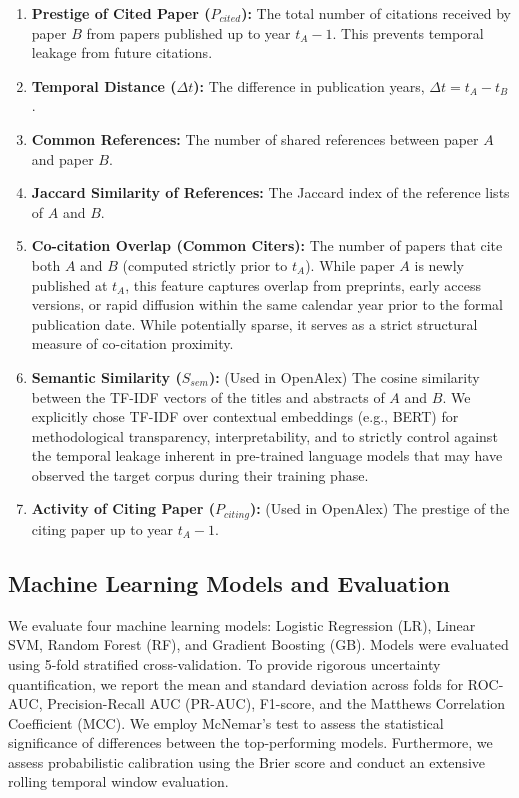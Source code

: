 \documentclass[12pt,a4paper]{article}
\begin{document}
\begin{enumerate}
    \item \textbf{Prestige of Cited Paper ($P_{cited}$):} The total number of citations received by paper $B$ from papers published up to year $t_A - 1$. This prevents temporal leakage from future citations.
    \item \textbf{Temporal Distance ($\Delta t$):} The difference in publication years, $\Delta t = t_A - t_B$.
    \item \textbf{Common References:} The number of shared references between paper $A$ and paper $B$.
    \item \textbf{Jaccard Similarity of References:} The Jaccard index of the reference lists of $A$ and $B$.
    \item \textbf{Co-citation Overlap (Common Citers):} The number of papers that cite both $A$ and $B$ (computed strictly prior to $t_A$). While paper $A$ is newly published at $t_A$, this feature captures overlap from preprints, early access versions, or rapid diffusion within the same calendar year prior to the formal publication date. While potentially sparse, it serves as a strict structural measure of co-citation proximity.
    \item \textbf{Semantic Similarity ($S_{sem}$):} (Used in OpenAlex) The cosine similarity between the TF-IDF vectors of the titles and abstracts of $A$ and $B$. We explicitly chose TF-IDF over contextual embeddings (e.g., BERT) for methodological transparency, interpretability, and to strictly control against the temporal leakage inherent in pre-trained language models that may have observed the target corpus during their training phase.
    \item \textbf{Activity of Citing Paper ($P_{citing}$):} (Used in OpenAlex) The prestige of the citing paper up to year $t_A - 1$.
\end{enumerate}

\subsection{Machine Learning Models and Evaluation}
We evaluate four machine learning models: Logistic Regression (LR), Linear SVM, Random Forest (RF), and Gradient Boosting (GB). Models were evaluated using 5-fold stratified cross-validation. To provide rigorous uncertainty quantification, we report the mean and standard deviation across folds for ROC-AUC, Precision-Recall AUC (PR-AUC), F1-score, and the Matthews Correlation Coefficient (MCC). We employ McNemar's test to assess the statistical significance of differences between the top-performing models. Furthermore, we assess probabilistic calibration using the Brier score and conduct an extensive rolling temporal window evaluation.
\end{document}
